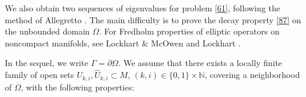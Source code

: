 \documentclass[reqno, 11pt, a4paper]{amsart}
\numberwithin{equation}{section}
\begin{document}
We also obtain { two sequences of eigenvalues} for problem \eqref{61}, following the method of Allegretto \cite{allegreto1992eigenvalueindefiniteweight}. The main difficulty is to prove the decay property \eqref{87} on the unbounded domain \(\Omega\). For Fredholm properties of elliptic operators on noncompact manifolds, see Lockhart \& McOwen \cite{lockartowen1985ellipticoperators} and Lockhart \cite{lockhart1980fredholm}.



 
 



  

In the sequel, we write \(\Gamma=\partial\Omega\). We assume that there exists {a locally finite family of open sets \(U_{k,i},\hat U_{k,i}\subset M\), \((k,i)\in\{0,1\}\times\mathbb N\), covering a neighborhood of \(\overline\Omega\)}, with the following properties:
\end{document}
